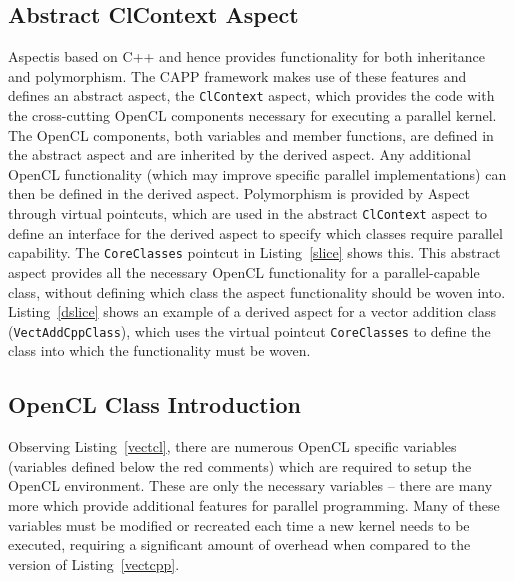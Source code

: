\documentclass{sig-alternate-05-2015}
\begin{document}
\subsection{Abstract ClContext Aspect}

Aspect\CPP is based on C++ and hence provides functionality for both inheritance
and polymorphism. The  CAPP framework makes use of these features and defines
an abstract aspect, the \lstinline$ClContext$ aspect, which provides the \CPP code with 
the cross-cutting OpenCL components necessary for executing a parallel kernel.
The OpenCL  components, both variables and member functions, are defined in the abstract 
aspect and are inherited by the derived aspect. Any additional OpenCL
functionality (which may improve specific parallel implementations) can then be 
defined in the derived aspect. Polymorphism is provided by Aspect\CPP 
through virtual pointcuts, which are used in the abstract
\lstinline$ClContext$ aspect to define an interface for the derived aspect
to specify which \CPP classes require parallel capability.
The \lstinline$CoreClasses$ pointcut in Listing~\ref{slice} shows this.
This abstract aspect provides all the necessary OpenCL functionality for a 
parallel-capable class, without defining which \CPP class 
the aspect functionality should be woven into. Listing~\ref{dslice} shows an
example of a derived aspect for a \CPP vector addition class (\lstinline$VectAddCppClass$), 
which uses the virtual pointcut \lstinline$CoreClasses$ to define the \CPP class
into which the functionality must be woven.

\subsection{OpenCL Class Introduction}

Observing Listing~\ref{vectcl}, there are numerous OpenCL specific variables
(variables defined below the red comments) which are required to setup the 
OpenCL environment. These are only the necessary variables -- there are many
more which provide additional features for parallel programming.
Many of these variables must be modified or recreated each
time a new kernel needs to be executed, requiring a significant amount of 
overhead when compared to the \CPP version of Listing~\ref{vectcpp}.
\end{document}

